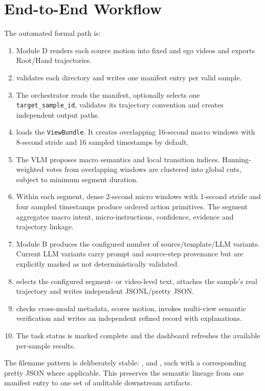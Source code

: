 \documentclass[11pt,oneside]{report}
\begin{document}
\section{End-to-End Workflow}
The automated formal path is:

\begin{enumerate}
    \item Module D renders each source motion into fixed and ego videos and
    exports Root/Hand trajectories.
    \item {} validates each directory and
    writes one manifest entry per valid sample.
    \item The orchestrator reads the manifest, optionally selects one
    \texttt{target\_sample\_id}, validates its trajectory convention and creates
    independent output paths.
    \item {} loads the \texttt{ViewBundle}. It creates
    overlapping 16-second macro windows with 8-second stride and 16 sampled
    timestamps by default.
    \item The VLM proposes macro semantics and local transition indices.
    Hanning-weighted votes from overlapping windows are clustered into global
    cuts, subject to minimum segment duration.
    \item Within each segment, dense 2-second micro windows with 1-second stride
    and four sampled timestamps produce ordered action primitives. The segment
    aggregates macro intent, micro-instructions, confidence, evidence and
    trajectory linkage.
    \item Module B produces the configured number of source/template/LLM
    variants. Current LLM variants carry prompt and source-step provenance but
    are explicitly marked as not deterministically validated.
    \item {} selects the configured segment- or
    video-level text, attaches the sample's real trajectory and writes
    independent JSONL/pretty JSON.
    \item {} checks cross-modal metadata, scores
    motion, invokes multi-view semantic verification and writes an independent
    refined record with explanations.
    \item The task status is marked complete and the dashboard refreshes the
    available per-sample results.
\end{enumerate}

The filename pattern is deliberately stable:
,
 and
, each with a corresponding pretty JSON
where applicable. This preserves the semantic lineage from one manifest entry
to one set of auditable downstream artifacts.
\end{document}
